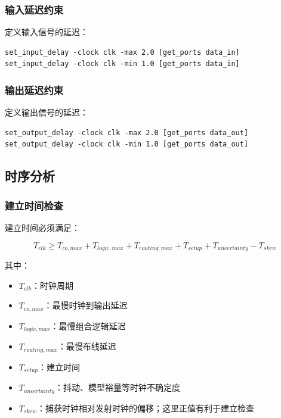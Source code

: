 \subsubsection{输入延迟约束}

定义输入信号的延迟：

\begin{verbatim}
set_input_delay -clock clk -max 2.0 [get_ports data_in]
set_input_delay -clock clk -min 1.0 [get_ports data_in]
\end{verbatim}

\subsubsection{输出延迟约束}

定义输出信号的延迟：

\begin{verbatim}
set_output_delay -clock clk -max 2.0 [get_ports data_out]
set_output_delay -clock clk -min 1.0 [get_ports data_out]
\end{verbatim}

\subsection{时序分析}

\subsubsection{建立时间检查}

建立时间必须满足：

\begin{equation}
T_{clk} \geq T_{co,max} + T_{logic,max} + T_{routing,max} + T_{setup}
  + T_{uncertainty} - T_{skew} \label{eq:fpga-setup-time}
\end{equation}

其中：
\begin{itemize}
  \item $T_{clk}$：时钟周期
  \item $T_{co,max}$：最慢时钟到输出延迟
  \item $T_{logic,max}$：最慢组合逻辑延迟
  \item $T_{routing,max}$：最慢布线延迟
  \item $T_{setup}$：建立时间
  \item $T_{uncertainty}$：抖动、模型裕量等时钟不确定度
  \item $T_{skew}$：捕获时钟相对发射时钟的偏移；这里正值有利于建立检查
\end{itemize}

